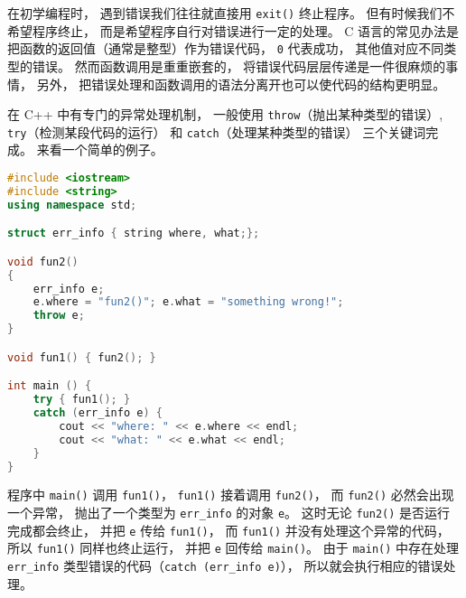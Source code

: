 
\begin{issues}
\issueMissDepend
\end{issues}

在初学编程时， 遇到错误我们往往就直接用 \verb|exit()| 终止程序。 但有时候我们不希望程序终止， 而是希望程序自行对错误进行一定的处理。 C 语言的常见办法是把函数的返回值（通常是整型）作为错误代码， \verb|0| 代表成功， 其他值对应不同类型的错误。 然而函数调用是重重嵌套的， 将错误代码层层传递是一件很麻烦的事情， 另外， 把错误处理和函数调用的语法分离开也可以使代码的结构更明显。

在 C++ 中有专门的异常处理机制， 一般使用 \verb|throw|（抛出某种类型的错误）, \verb|try|（检测某段代码的运行） 和 \verb|catch|（处理某种类型的错误） 三个关键词完成。 来看一个简单的例子。

\begin{lstlisting}[language=cpp]
#include <iostream>
#include <string>
using namespace std;

struct err_info { string where, what;};

void fun2()
{
	err_info e;
	e.where = "fun2()"; e.what = "something wrong!";
	throw e;
}

void fun1() { fun2(); }

int main () {
	try { fun1(); }
	catch (err_info e) {
		cout << "where: " << e.where << endl;
		cout << "what: " << e.what << endl; 
	}
}
\end{lstlisting}
程序中 \verb|main()| 调用 \verb|fun1()|， \verb|fun1()| 接着调用 \verb|fun2()|， 而 \verb|fun2()| 必然会出现一个异常， 抛出了一个类型为 \verb|err_info| 的对象 \verb|e|。 这时无论 \verb|fun2()| 是否运行完成都会终止， 并把 \verb|e| 传给 \verb|fun1()|， 而 \verb|fun1()| 并没有处理这个异常的代码， 所以 \verb|fun1()| 同样也终止运行， 并把 \verb|e| 回传给 \verb|main()|。 由于 \verb|main()| 中存在处理 \verb|err_info| 类型错误的代码（\verb|catch (err_info e)|）， 所以就会执行相应的错误处理。
